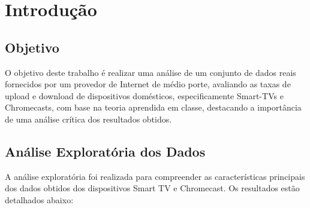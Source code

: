 \section{Introdução}

\subsection{Objetivo}

O objetivo deste trabalho é realizar uma análise de um conjunto de dados reais fornecidos por um provedor de Internet de médio porte, avaliando as taxas de upload e download de dispositivos domésticos, especificamente Smart-TVs e Chromecasts, com base na teoria aprendida em classe, destacando a importância de uma análise crítica dos resultados obtidos.

\subsection{Análise Exploratória dos Dados}\label{sec:eda}

A análise exploratória foi realizada para compreender as características principais dos dados obtidos dos dispositivos Smart TV e Chromecast. Os resultados estão detalhados abaixo:

